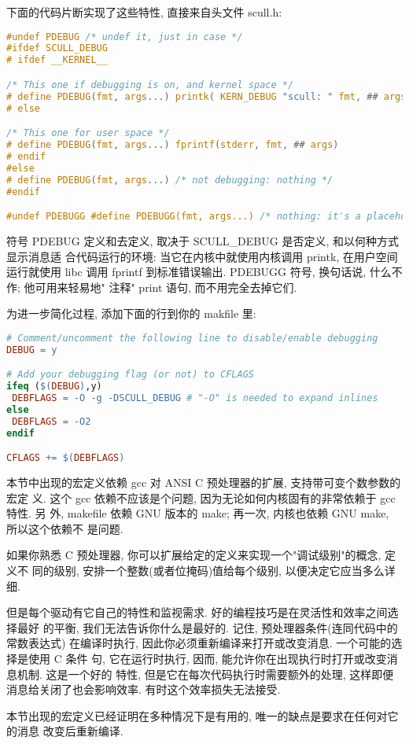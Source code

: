 \documentclass[a4paper,titlepage]{article}
\begin{document}
下面的代码片断实现了这些特性, 直接来自头文件 scull.h:
\begin{lstlisting}[language=c]
#undef PDEBUG /* undef it, just in case */
#ifdef SCULL_DEBUG
# ifdef __KERNEL__

/* This one if debugging is on, and kernel space */
# define PDEBUG(fmt, args...) printk( KERN_DEBUG "scull: " fmt, ## args)
# else

/* This one for user space */
# define PDEBUG(fmt, args...) fprintf(stderr, fmt, ## args)
# endif
#else
# define PDEBUG(fmt, args...) /* not debugging: nothing */
#endif

#undef PDEBUGG #define PDEBUGG(fmt, args...) /* nothing: it's a placeholder */
\end{lstlisting}
符号 PDEBUG 定义和去定义, 取决于 SCULL_DEBUG 是否定义, 和以何种方式显示消息适
合代码运行的环境: 当它在内核中就使用内核调用 printk, 在用户空间运行就使用 libc
调用 fprintf 到标准错误输出. PDEBUGG 符号, 换句话说, 什么不作; 他可用来轻易地"
注释" print 语句, 而不用完全去掉它们.

为进一步简化过程, 添加下面的行到你的 makfile 里:
\begin{lstlisting}[language=make]
# Comment/uncomment the following line to disable/enable debugging
DEBUG = y

# Add your debugging flag (or not) to CFLAGS
ifeq ($(DEBUG),y)
 DEBFLAGS = -O -g -DSCULL_DEBUG # "-O" is needed to expand inlines
else
 DEBFLAGS = -O2
endif

CFLAGS += $(DEBFLAGS) 
\end{lstlisting}
本节中出现的宏定义依赖 gcc 对 ANSI C 预处理器的扩展, 支持带可变个数参数的宏定
义. 这个 gcc 依赖不应该是个问题, 因为无论如何内核固有的非常依赖于 gcc 特性. 另
外, makefile 依赖 GNU 版本的 make; 再一次, 内核也依赖 GNU make, 所以这个依赖不
是问题.

如果你熟悉 C 预处理器, 你可以扩展给定的定义来实现一个"调试级别"的概念, 定义不
同的级别, 安排一个整数(或者位掩码)值给每个级别, 以便决定它应当多么详细.

但是每个驱动有它自己的特性和监视需求. 好的编程技巧是在灵活性和效率之间选择最好
的平衡, 我们无法告诉你什么是最好的. 记住, 预处理器条件(连同代码中的常数表达式)
在编译时执行, 因此你必须重新编译来打开或改变消息. 一个可能的选择是使用 C 条件
句, 它在运行时执行, 因而, 能允许你在出现执行时打开或改变消息机制. 这是一个好的
特性, 但是它在每次代码执行时需要额外的处理, 这样即便消息给关闭了也会影响效率.
有时这个效率损失无法接受.

本节出现的宏定义已经证明在多种情况下是有用的, 唯一的缺点是要求在任何对它的消息
改变后重新编译.
\end{document}

